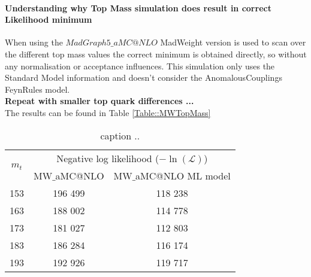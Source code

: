 \paragraph{Understanding why Top Mass simulation does result in correct Likelihood minimum\\}
When using the $MadGraph5\_aMC@NLO$ MadWeight version is used to scan over the different top mass values the correct minimum is obtained directly, so without any normalisation or acceptance influences. This simulation only uses the Standard Model information and doesn't consider the AnomalousCouplings FeynRules model.\\
\textbf{Repeat with smaller top quark differences ...}\\
The results can be found in Table \ref{Table::MWTopMass}
\begin{table}[h!]
 \centering
 \begin{tabular}{|c|c|c|}
  \hline
  \multirow{2}{*}{$m_{t}$}	&  \multicolumn{2}{|c|}{Negative log likelihood ($-\ln(\mathcal{L})$)} \\ 
				& MW$\_$aMC@NLO	& MW$\_$aMC@NLO ML model\\
  \hline
    153 			& 196 499	& 118 238\\
    163				& 188 002	& 114 778\\
    173				& 181 027	& 112 803\\
    183				& 186 284	& 116 174\\
    193				& 192 926	& 119 717\\
  \hline 
 \end{tabular} 
 \caption{ caption ..} \label{table::MWTopMass}
\end{table}


